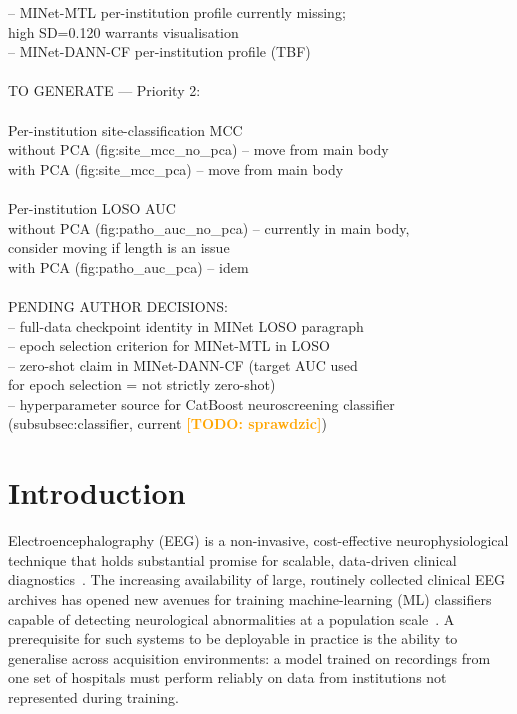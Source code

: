 \documentclass[preprint,12pt]{elsarticle}
\newcommand{\td}[1]{\textcolor{orange}{\textbf{[TODO: #1]}}}
\begin{document}
{{\quad\quad -- MINet-MTL per-institution profile currently missing;\\
\quad\quad\quad high SD=0.120 warrants visualisation\\
\quad\quad -- MINet-DANN-CF per-institution profile (TBF)\\
\\
TO GENERATE --- Priority 2:\\
\\
\quad [Appendix] Per-institution site-classification MCC\\
\quad\quad without PCA (fig:site\_mcc\_no\_pca) -- move from main body\\
\quad\quad with PCA (fig:site\_mcc\_pca) -- move from main body\\
\\
\quad [Appendix] Per-institution LOSO AUC\\
\quad\quad without PCA (fig:patho\_auc\_no\_pca) -- currently in main body,\\
\quad\quad\quad consider moving if length is an issue\\
\quad\quad with PCA (fig:patho\_auc\_pca) -- idem\\
\\
PENDING AUTHOR DECISIONS:\\
\quad -- full-data checkpoint identity in MINet LOSO paragraph\\
\quad -- epoch selection criterion for MINet-MTL in LOSO\\
\quad -- zero-shot claim in MINet-DANN-CF (target AUC used\\
\quad\quad for epoch selection = not strictly zero-shot)\\
\quad -- hyperparameter source for CatBoost neuroscreening classifier\\
\quad\quad (subsubsec:classifier, current \td{sprawdzic})\\
}}





\section{Introduction}
\label{sec:introduction}

Electroencephalography (EEG) is a non-invasive, cost-effective
neurophysiological technique that holds substantial promise for
scalable, data-driven clinical diagnostics~\cite{poziomska2026quantity}.
The increasing availability of large, routinely collected clinical EEG
archives has opened new avenues for training machine-learning (ML)
classifiers capable of detecting neurological abnormalities at a
population scale~\cite{mushtaq2025eeg}.
A prerequisite for such systems to be deployable in practice is the
ability to generalise across acquisition environments: a model trained
on recordings from one set of hospitals must perform reliably on data
from institutions not represented during training.
\end{document}
